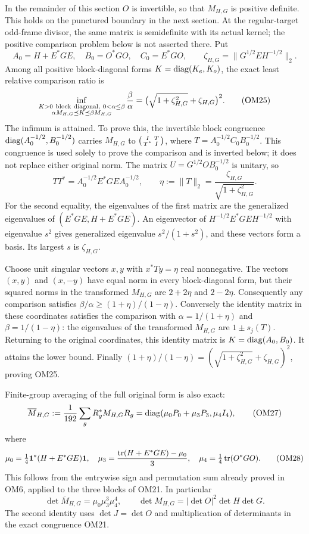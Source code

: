 \documentclass[11pt]{article}
\begin{document}
In the remainder of this section $O$ is invertible, so that $M_{H,G}$
is positive definite.  This holds on the punctured boundary in
the next section.  At the regular-target odd-frame divisor, the
same matrix is semidefinite with its actual kernel; the positive
comparison problem below is not asserted there.
Put
\[
A_0=H+E^*GE,\quad B_0=O^*GO,\quad C_0=E^*GO,\qquad
\zeta_{H,G}=\|G^{1/2}EH^{-1/2}\|_2 .
\tag{OM24}
\]
Among all positive block-diagonal forms $K=\operatorname{diag}(K_e,K_o)$,
the exact least relative comparison ratio is
\[
\inf_{\substack{K>0\ {\rm block\ diagonal},\ 0<\alpha\le\beta\\
                 \alpha M_{H,G}\preceq K\preceq\beta M_{H,G}}}
\frac{\beta}{\alpha}
=\bigl(\sqrt{1+\zeta_{H,G}^2}+\zeta_{H,G}\bigr)^2.
\tag{OM25}
\]
The infimum is attained.  To prove this, the invertible block
congruence $\operatorname{diag}(A_0^{-1/2},B_0^{-1/2})$ carries $M_{H,G}$ to
$\begin{psmallmatrix}I&T\\T^*&I\end{psmallmatrix}$, where
$T=A_0^{-1/2}C_0B_0^{-1/2}$.  This congruence is used solely
to prove the comparison and is inverted below; it does not
replace either original norm.  The matrix
$U=G^{1/2}OB_0^{-1/2}$ is unitary, so
\[
TT^*=A_0^{-1/2}E^*GEA_0^{-1/2},\qquad
\eta:=\|T\|_2=\frac{\zeta_{H,G}}{\sqrt{1+\zeta_{H,G}^2}}.
\tag{OM26}
\]
For the second equality, the eigenvalues of the first matrix are
the generalized eigenvalues of $(E^*GE,H+E^*GE)$.
An eigenvector of $H^{-1/2}E^*GEH^{-1/2}$ with eigenvalue
$s^2$ gives generalized eigenvalue $s^2/(1+s^2)$, and these
vectors form a basis.  Its largest $s$ is $\zeta_{H,G}$.

Choose unit singular vectors $x,y$ with $x^*Ty=\eta$ real
nonnegative.  The vectors $(x,y)$ and $(x,-y)$ have equal
norm in every block-diagonal form, but their squared norms in
the transformed $M_{H,G}$ are $2+2\eta$ and $2-2\eta$.
Consequently any comparison satisfies
$\beta/\alpha\ge(1+\eta)/(1-\eta)$.
Conversely the identity matrix in these coordinates satisfies
the comparison with
$\alpha=1/(1+\eta)$ and $\beta=1/(1-\eta)$:
the eigenvalues of the transformed $M_{H,G}$ are $1\pm s_j(T)$.
Returning to the original coordinates, this identity matrix is
$K=\operatorname{diag}(A_0,B_0)$.  It attains the lower bound.
Finally $(1+\eta)/(1-\eta)=
(\sqrt{1+\zeta_{H,G}^2}+\zeta_{H,G})^2$, proving OM25.

Finite-group averaging of the full original form is also exact:
\[
\overline M_{H,G}
 :=\frac1{192}\sum_gR_g^*M_{H,G}R_g
 =\operatorname{diag}(\mu_0P_0+\mu_3P_3,\mu_4I_4),
\tag{OM27}
\]
where
\[
\mu_0=\tfrac14\mathbf 1^*(H+E^*GE)\mathbf 1,\quad
\mu_3=\frac{\operatorname{tr}(H+E^*GE)-\mu_0}{3},\quad
\mu_4=\tfrac14\operatorname{tr}(O^*GO).
\tag{OM28}
\]
This follows from the entrywise sign and permutation sum already
proved in OM6, applied to the three blocks of OM21.  In particular
\[
\det\overline M_{H,G}=\mu_0\mu_3^3\mu_4^4,\qquad
\det M_{H,G}=|\det O|^2\det H\det G.
\tag{OM29}
\]
The second identity uses $\det J=\det O$ and multiplication of
determinants in the exact congruence OM21.
\end{document}
